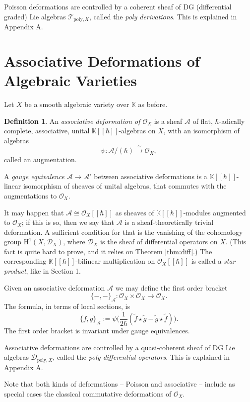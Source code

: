 \documentclass{conm-p-l}
\theoremstyle{definition}
\newtheorem{dfn}[equation]{Definition}
\numberwithin{equation}{section}
\newcommand{\iso}{\stackrel{\simeq}{\longrightarrow}}
\newcommand{\mcal}[1]{\mathcal{#1}}
\newcommand{\mrm}[1]{\mathrm{#1}}
\newcommand{\mbb}[1]{\mathbb{#1}}
\newcommand{\til}[1]{\tilde{#1}}
\newcommand{\K}{\mbb{K}}
\newcommand{\smfrac}[2]{\textstyle \frac{#1}{#2}}
\begin{document}
Poisson deformations are controlled by a coherent sheaf of DG (differential
graded) Lie algebras 
$\mcal{T}^{}_{\mrm{poly}, X}$,
called the {\em poly derivations}. 
This is explained in Appendix A.




\section{Associative Deformations of Algebraic Varieties}

Let $X$ be a smooth algebraic variety over $\K$ as before.

\begin{dfn}
An {\em associative deformation of $\mcal{O}_X$} 
is a sheaf $\mcal{A}$ 
of flat, $\hbar$-adically complete, associative, unital 
$\K[[\hbar]]$-algebras on $X$, with an isomorphism of algebras
\[ \psi : \mcal{A} / (\hbar) \iso \mcal{O}_X , \]
called an augmentation.

A {\em gauge equivalence} $\mcal{A} \to \mcal{A}'$
between associative deformations is a $\K[[\hbar]]$-linear 
isomorphism of sheaves of unital algebras, that commutes with the 
augmentations to $\mcal{O}_X$. 
\end{dfn}

It may happen that $\mcal{A} \cong \mcal{O}_X[[\hbar]]$ as sheaves of
$\K[[\hbar]]$-modules augmented to $\mcal{O}_X$; if this is so,
then we say that $\mcal{A}$ is a sheaf-theoretically trivial deformation.
A sufficient condition for that is the vanishing of the cohomology group 
$\mrm{H}^1(X, \mcal{D}_X)$, where $\mcal{D}_X$ is the sheaf of differential
operators on $X$. (This fact is quite hard to prove, and it relies on Theorem
\ref{thm:diff}.)
The corresponding $\K[[\hbar]]$-bilinear multiplication on
$\mcal{O}_X[[\hbar]]$ is called a {\em star product}, like in Section 1.

Given an associative deformation $\mcal{A}$ we 
may define the first order bracket
\[ \{ -,- \}_{\mcal{A}} :  \mcal{O}_X \times \mcal{O}_X \to \mcal{O}_X
. \]
The formula, in terms of local sections, is
\[ \{ f,g \}_{\mcal{A}} :=
\psi \bigl( \smfrac{1}{2 \hbar} (\til{f} \star 
\til{g} - \til{g} \star \til{f}) \bigr) . \]
The first order bracket is invariant under gauge equivalences.

Associative deformations are controlled by a quasi-coherent sheaf of
DG Lie algebras $\mcal{D}^{}_{\mrm{poly}, X}$,
called the {\em poly differential operators}. 
This is explained in Appendix A.

Note that both kinds of deformations -- Poisson and associative --
include as special cases the classical commutative deformations of $\mcal{O}_X$.
\end{document}

